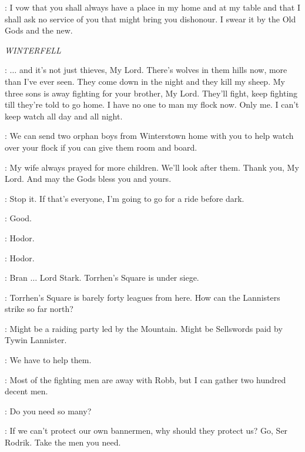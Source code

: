 
\CATELYN: I vow that you shall always have a place in my home and at my table and that I shall ask no service of you that might bring you dishonour. I swear it by the Old Gods and the new. 



\scene

\textit{WINTERFELL} 


\FARMER: $\ldots$ and it's not just thieves, My Lord. There's wolves in them hills now, more than I've ever seen. They come down in the night and they kill my sheep. My three sons is away fighting for your brother, My Lord. They'll fight, keep fighting till they're told to go home. I have no one to man my flock now. Only me. I can't keep watch all day and all night. 

\BRAN: We can send two orphan boys from Winterstown home with you to help watch over your flock if you can give them room and board. 

\FARMER: My wife always prayed for more children. We'll look after them. Thank you, My Lord. And may the Gods bless you and yours. 

\BRAN:  Stop it.  If that's everyone, I'm going to go for a ride before dark. 

\LUWIN: Good. 

\BRAN: Hodor. 

\HODOR: Hodor. 


\RODRIK: Bran $\ldots$ Lord Stark. Torrhen's Square is under siege. 

\LUWIN: Torrhen's Square is barely forty leagues from here. How can the Lannisters strike so far north? 

\RODRIK: Might be a raiding party led by the Mountain. Might be Sellswords paid by Tywin Lannister. 

\BRAN: We have to help them. 

\RODRIK: Most of the fighting men are away with Robb, but I can gather two hundred decent men. 

\LUWIN: Do you need so many? 

\BRAN: If we can't protect our own bannermen, why should they protect us? Go, Ser Rodrik. Take the men you need. 

